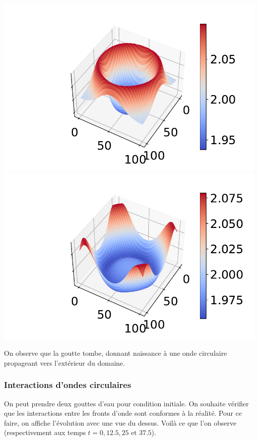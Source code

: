 \documentclass[
11pt, %
francais, %
singlespacing, %
headsepline, %
f%
]{MastersDoctoralThesis} %
\theoremstyle{definition}
\begin{document}
\begin{center}
\includegraphics[scale = 0.6]{goutte2D2}
\includegraphics[scale = 0.6]{goutte2D3} 
\end{center}

On observe que la goutte tombe, donnant naissance à une onde circulaire propageant vers l'extérieur du domaine.

\subsubsection{Interactions d'ondes circulaires}

On peut prendre deux gouttes d'eau pour condition initiale. On souhaite vérifier que les interactions entre les fronts d'onde sont conformes à la réalité. Pour ce faire, on affiche l'évolution avec une vue du dessus.
Voilà ce que l'on observe (respectivement aux temps $t=0, 12.5, 25$ et $37.5$).
\end{document}
